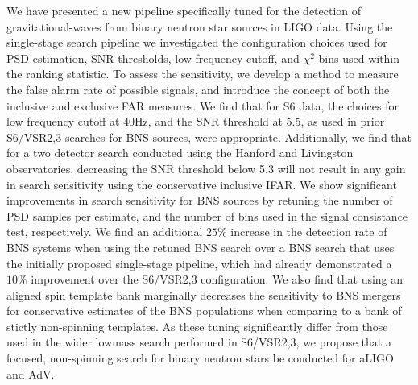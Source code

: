 We have presented a new pipeline specifically tuned for the detection
of gravitational-waves from binary neutron star sources in LIGO data. 
Using the single-stage search pipeline we investigated the configuration
choices used for PSD estimation, SNR thresholds, low frequency cutoff, 
and $\chi^2$ bins used within the ranking statistic. 
To assess the sensitivity, we develop a method to measure the false 
alarm rate of possible signals, and introduce the concept of both the
inclusive and exclusive FAR measures. We find that for S6 data, the 
choices for low frequency cutoff at 40Hz, and the SNR threshold at 5.5,
as used in prior S6/VSR2,3 searches for BNS sources, were appropriate.
Additionally, we find that for a two detector search conducted using
the Hanford and Livingston observatories, decreasing the SNR threshold
below 5.3 will not result in any gain in search sensitivity using the conservative 
inclusive IFAR. We show significant
improvements in search sensitivity for BNS sources by retuning the number of PSD
samples per estimate, and the number of bins used in the signal consistance test,
respectively. We find an additional $25\%$ increase in the detection rate
of BNS systems when using the retuned BNS search over a BNS search that
uses the initially proposed single-stage pipeline,
which had already demonstrated a $10\%$ improvement over the S6/VSR2,3 configuration.
We also find that using an aligned spin template bank marginally decreases the sensitivity 
to BNS mergers for conservative estimates of the BNS populations when
comparing to a bank of stictly non-spinning templates. As these tuning significantly
differ from those used in the wider lowmass search performed in S6/VSR2,3, 
we propose that a focused, non-spinning search for binary neutron
stars be conducted for aLIGO and AdV.
